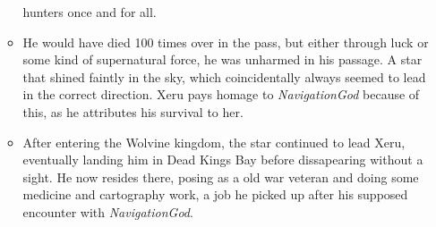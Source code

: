 \documentclass[12pt]{article}
\begin{document}
\begin{itemize}
\begin{itemize}
          hunters once and for all.
        \item He would have died 100 times over in the pass, but either through
          luck or some kind of supernatural force, he was unharmed in his
          passage. A star that shined faintly in the sky, which coincidentally
          always seemed to lead in the correct direction. Xeru pays homage to
          \textit{NavigationGod} because of this, as he attributes his survival
          to her.
        \item After entering the Wolvine kingdom, the star continued to lead
          Xeru, eventually landing him in Dead Kings Bay before dissapearing
          without a sight. He now resides there, posing as a old war veteran and
          doing some medicine and cartography work, a job he picked up after his
          supposed encounter with \textit{NavigationGod}.
      \end{itemize}
  \end{itemize}
\fi
\end{document}
